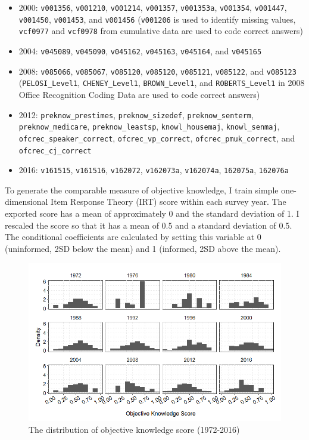 \begin{itemize}
    \item 2000: \texttt{v001356}, \texttt{v001210}, \texttt{v001214}, \texttt{v001357}, \texttt{v001353a}, \texttt{v001354}, \texttt{v001447}, \texttt{v001450}, \texttt{v001453}, and \texttt{v001456} (\texttt{v001206} is used to identify missing values, \texttt{vcf0977} and \texttt{vcf0978} from cumulative data are used to code correct answers)
    \item 2004: \texttt{v045089}, \texttt{v045090}, \texttt{v045162}, \texttt{v045163}, \texttt{v045164}, and \texttt{v045165}
    \item 2008: \texttt{v085066}, \texttt{v085067}, \texttt{v085120}, \texttt{v085120}, \texttt{v085121}, \texttt{v085122}, and \texttt{v085123} (\texttt{PELOSI\_Level1}, \texttt{CHENEY\_Level1}, \texttt{BROWN\_Level1}, and \texttt{ROBERTS\_Level1} in 2008 Office Recognition Coding Data are used to code correct answers)
    \item 2012: \texttt{preknow\_prestimes}, \texttt{preknow\_sizedef}, \texttt{preknow\_senterm}, \texttt{preknow\_medicare}, \texttt{preknow\_leastsp}, \texttt{knowl\_housemaj}, \texttt{knowl\_senmaj}, \texttt{ofcrec\_speaker\_correct}, \texttt{ofcrec\_vp\_correct}, \texttt{ofcrec\_pmuk\_correct}, and \texttt{ofcrec\_cj\_correct}
    \item 2016: \texttt{v161515}, \texttt{v161516}, \texttt{v162072}, \texttt{v162073a}, \texttt{v162074a}, \texttt{162075a}, \texttt{162076a}
\end{itemize}

\noindent To generate the comparable measure of objective knowledge, I train simple one-dimensional Item Response Theory (IRT) score within each survey year. The exported score has a mean of approximately 0 and the standard deviation of 1. I rescaled the score so that it has a mean of 0.5 and a standard deviation of 0.5. The conditional coefficients are calculated by setting this variable at 0 (uninformed, 2SD below the mean) and 1 (informed, 2SD above the mean). 

\begin{figure}[ht!!!]
    \caption{The distribution of objective knowledge score (1972-2016)}
    \label{fig:anes_objkndist}
    \includegraphics[width=\linewidth]{../outputs/anes_objkndist.png}
\end{figure}


